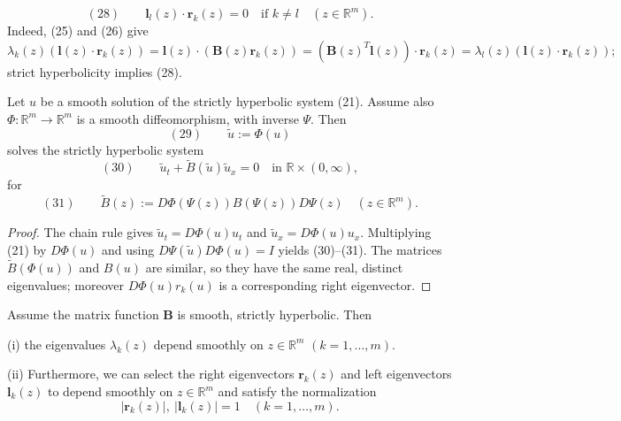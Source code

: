 \begin{remark}
\label{rem:eigenvector-orthogonality}

$$(28) \qquad \mathbf{l}_l(z)\cdot\mathbf{r}_k(z) = 0 \quad \text{if } k\neq l \quad (z\in\mathbb{R}^m).$$
Indeed, (25) and (26) give
$$\lambda_k(z)(\mathbf{l}(z)\cdot\mathbf{r}_k(z)) = \mathbf{l}(z)\cdot(\mathbf{B}(z)\mathbf{r}_k(z)) = (\mathbf{B}(z)^T\mathbf{l}(z))\cdot\mathbf{r}_k(z) = \lambda_l(z)(\mathbf{l}(z)\cdot\mathbf{r}_k(z));$$
strict hyperbolicity implies (28).
\end{remark}

\begin{theorem}
\label{thm:invariance-hyperbolicity-coordinate-change}

Let $u$ be a smooth solution of the strictly hyperbolic system (21). Assume also $\Phi:\mathbb{R}^m\to\mathbb{R}^m$ is a smooth diffeomorphism, with inverse $\Psi$. Then
$$(29) \qquad \tilde{u} := \Phi(u)$$
solves the strictly hyperbolic system
$$(30) \qquad \tilde u_t + \tilde B(\tilde u)\tilde u_x = 0 \quad \text{in } \mathbb{R}\times(0,\infty),$$
for
$$(31) \qquad \tilde B(z) := D\Phi(\Psi(z))B(\Psi(z))D\Psi(z) \quad (z\in\mathbb{R}^m).$$
\end{theorem}

\begin{proof}
\sketch The chain rule gives $\widetilde u_t=D\Phi(u)u_t$ and $\widetilde u_x=D\Phi(u)u_x$. Multiplying (21) by $D\Phi(u)$ and using $D\Psi(\widetilde u)D\Phi(u)=I$ yields (30)--(31). The matrices $\widetilde B(\Phi(u))$ and $B(u)$ are similar, so they have the same real, distinct eigenvalues; moreover $D\Phi(u)r_k(u)$ is a corresponding right eigenvector.
\end{proof}

\begin{theorem}
\label{thm:smooth-dependence-eigenvalues-eigenvectors}

Assume the matrix function $\mathbf{B}$ is smooth, strictly hyperbolic. Then

(i) the eigenvalues $\lambda_k(z)$ depend smoothly on $z\in\mathbb{R}^m$ $(k=1,\ldots,m)$.

(ii) Furthermore, we can select the right eigenvectors $\mathbf{r}_k(z)$ and left eigenvectors $\mathbf{l}_k(z)$ to depend smoothly on $z\in\mathbb{R}^m$ and satisfy the normalization
$$|\mathbf{r}_k(z)|,\ |\mathbf{l}_k(z)| = 1 \quad (k=1,\ldots,m).$$
\end{theorem}

